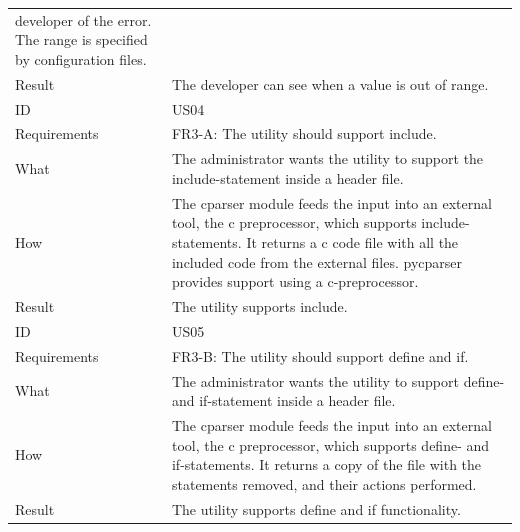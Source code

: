 \begin{table}[htbp]
{\begin{tabularx}{1.2\textwidth}{l X}
		developer of the error. The range is specified by configuration files. \\
	Result & The developer can see when a value is out of range. \\
	\midrule
	ID & US04 \\
	Requirements & FR3-A: The \gls{utility} should support \gls{include}.\\
	What & The administrator wants the \gls{utility} to support the \gls{include}-statement inside a \gls{header} file.\\
	How & The cparser module feeds the input into an external tool, the \Gls{c} \gls{preprocessor}, which supports 
		\gls{include}-statements. It returns a \Gls{c} code file with all the included code from the external files. pycparser
		provides support using a \Gls{c}-\gls{preprocessor}.  \\
	Result & The \gls{utility} supports \gls{include}. \\
	\midrule
	ID & US05 \\
	Requirements & FR3-B: The \gls{utility} should support \gls{define} and \gls{if}. \\
	What & The administrator wants the \gls{utility} to support \gls{define}- and \gls{if}-statement inside a \gls{header} file.\\
	How & The cparser module feeds the input into an external tool, the \Gls{c} \gls{preprocessor}, which supports 
		\gls{define}- and \gls{if}-statements. It returns a copy of the file with the statements removed, and their actions performed. \\
	Result & The \gls{utility} supports \gls{define} and \gls{if} functionality. \\
	\bottomrule
\end{tabularx}}
\end{table}

